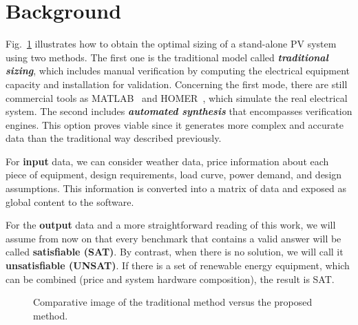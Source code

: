 \documentclass[review]{elsarticle}
\begin{document}
\section{Background}
\label{sec:Background}
Fig.~\ref{fig:optimization} illustrates how to obtain the optimal sizing of a stand-alone PV system using two methods. The first one is the traditional model called \textit{\textbf{traditional sizing}}, which includes manual verification by computing the electrical equipment capacity and installation for validation. Concerning the first mode, there are still commercial tools as MATLAB~\citep{Benatiallah2017} and HOMER~\citep{Pradhan,Swarnkar}, which simulate the real electrical system. The second includes \textbf{\textit{automated synthesis}} that encompasses verification engines. This option proves viable since it generates more complex and accurate data than the traditional way described previously. 

For \textbf{input} data, we can consider weather data, price information about each piece of equipment, design requirements, load curve, power demand, and design assumptions. This information is converted into a matrix of data and exposed as global content to the software.

For the \textbf{output} data and a more straightforward reading of this work, we will assume from now on that every benchmark that contains a valid answer will be called \textbf{satisfiable (SAT)}. By contrast, when there is no solution, we will call it \textbf{unsatisfiable (UNSAT)}. If there is a set of renewable energy equipment, which can be combined (price and system hardware composition), the result is SAT.

\begin{figure}[ht]
\begin{center}
\end{center}
\caption{Comparative image of the traditional method versus the proposed method.}
\label{fig:optimization}
\end{figure}
  
\end{document}
